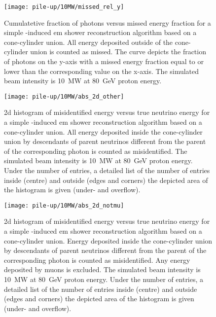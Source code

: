 \begin{figure}[htb]
	\centering
	\texttt{[image: pile-up/10MW/missed\_rel\_y]}
	\caption{Cumulatetive fraction of photons versus missed energy fraction for a simple \Pgpz-induced \gls{em} shower reconstruction algorithm based on a cone-cylinder union.
		All energy deposited outside of the cone-cylinder union is counted as missed.
		The curve depicts the fraction of photons on the y-axis with a missed energy fraction equal to or lower than the corresponding value on the x-axis.
		The simulated beam intensity is \SI{10}{\mega\watt} at \SI{80}{\giga\electronvolt} proton energy.}
\end{figure}

\begin{figure}[htb]
	\centering
	\texttt{[image: pile-up/10MW/abs\_2d\_other]}
	\caption{\gls{2d} histogram of misidentified energy versus true neutrino energy for a simple \Pgpz-induced \gls{em} shower reconstruction algorithm based on a cone-cylinder union.
		All energy deposited inside the cone-cylinder union by descendants of parent neutrinos different from the parent of the corresponding \Pgpz photon is counted as misidentified.
		The simulated beam intensity is \SI{10}{\mega\watt} at \SI{80}{\giga\electronvolt} proton energy.
		Under the number of entries, a detailed list of the number of entries inside (centre) and outside (edges and corners) the depicted area of the histogram is given (under- and overflow).}
\end{figure}

\begin{figure}[htb]
	\centering
	\texttt{[image: pile-up/10MW/abs\_2d\_notmu]}
	\caption{\gls{2d} histogram of misidentified energy versus true neutrino energy for a simple \Pgpz-induced \gls{em} shower reconstruction algorithm based on a cone-cylinder union.
		Energy deposited inside the cone-cylinder union by descendants of parent neutrinos different from the parent of the corresponding \Pgpz photon is counted as misidentified.
		Any energy deposited by muons is excluded.
		The simulated beam intensity is \SI{10}{\mega\watt} at \SI{80}{\giga\electronvolt} proton energy.
		Under the number of entries, a detailed list of the number of entries inside (centre) and outside (edges and corners) the depicted area of the histogram is given (under- and overflow).}
\end{figure}

